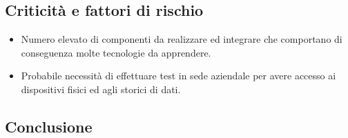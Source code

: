 \subsection{Criticità e fattori di rischio}
\begin{itemize}
	\item Numero elevato di componenti da realizzare ed integrare che comportano di conseguenza molte tecnologie da apprendere. 
	\item Probabile necessità di effettuare test in sede aziendale per avere accesso ai dispositivi fisici ed agli storici di dati.
\end{itemize}
\subsection{Conclusione}

